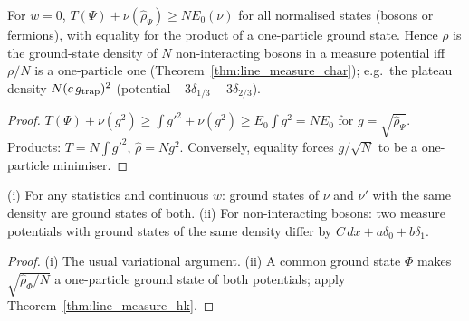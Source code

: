 \begin{theorem}
  \label{thm:line_measureN_bos}
  \leanok
  For $w=0$, $T(\Psi)+\nu(\hat\rho_\Psi)\ge N E_0(\nu)$ for all normalised states (bosons or fermions), with equality for the
  product of a one-particle ground state. Hence $\rho$ is the ground-state density of $N$ non-interacting bosons in a
  measure potential iff $\rho/N$ is a one-particle one (Theorem~\ref{thm:line_measure_char}); e.g.\ the plateau density
  $N(c\,g_{\rm trap})^2$ (potential $-3\delta_{1/3}-3\delta_{2/3}$).
\end{theorem}
\begin{proof}
  \leanok
  $T(\Psi)+\nu(g^2)\ge\int g'^2+\nu(g^2)\ge E_0\int g^2=NE_0$ for $g=\sqrt{\hat\rho_\Psi}$. Products: $T=N\int g'^2$, $\hat\rho=Ng^2$.
  Conversely, equality forces $g/\sqrt N$ to be a one-particle minimiser.
\end{proof}

\begin{theorem}
  \label{thm:line_measureN_hk}
  \leanok
  (i) For any statistics and continuous $w$: ground states of $\nu$ and $\nu'$ with the same density are ground states of
  both. (ii) For non-interacting bosons: two measure potentials with ground states of the same density differ by
  $C\,dx+a\delta_0+b\delta_1$.
\end{theorem}
\begin{proof}
  \leanok
  (i) The usual variational argument. (ii) A common ground state $\Phi$ makes $\sqrt{\hat\rho_\Phi/N}$ a one-particle ground
  state of both potentials; apply Theorem~\ref{thm:line_measure_hk}.
\end{proof}

